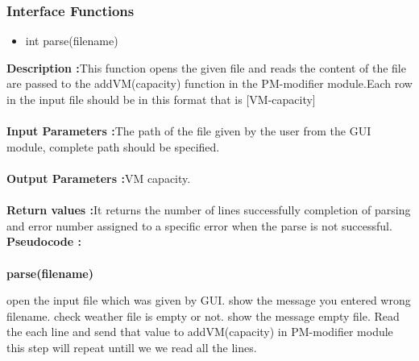 ﻿\documentclass[a4paper,11pt]{article}
\begin{document}
\subsubsection{Interface Functions}
\begin{itemize}
\item int parse(filename)
\end{itemize}
\textbf{Description :}This function opens the given file and reads the content of the file are passed to the addVM(capacity) function in the PM-modifier module.Each row in the input file should be in this format that is [VM-capacity]\\
\\
\textbf{Input Parameters :}The path of the file given by the user from the GUI module, complete path should be specified.\\
\\
\textbf{Output Parameters :}VM capacity.\\
\\
\textbf{Return values :}It returns the number of lines successfully completion of parsing and error number assigned to a specific error when the parse is not successful.
\pagebreak
\\
\textbf{Pseudocode :}\\
\\
\textbf{parse(filename)}
\begin{algorithmic}[1]
\STATE open the input file which was given by GUI. 
\STATE show the message you entered wrong filename.
\ENDIF
\STATE check weather file is empty or not.
\STATE show the message empty file.
\ELSE
\STATE Read the each line and send that value to addVM(capacity) in PM-modifier module
\STATE this step will repeat untill we we read all the lines.
\ENDIF

\end{algorithmic}
\end{document}

